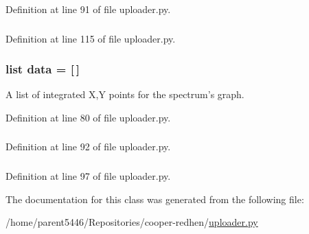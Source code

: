 Definition at line 91 of file uploader.py.\hypertarget{classuploader_1_1_spectrum_transfer_a511ae0b1c13f95e5f08f1a0dd3da3d93}{
\subsubsection[{data}]{}}
\label{classuploader_1_1_spectrum_transfer_a511ae0b1c13f95e5f08f1a0dd3da3d93}


Definition at line 115 of file uploader.py.\hypertarget{classuploader_1_1_spectrum_transfer_a018aaab493af92ea83348b0db6e32328}{
\subsubsection[{data}]{\setlength{\rightskip}{0pt plus 5cm}list {\bf data} = \mbox{[}$\,$\mbox{]}}}
\label{classuploader_1_1_spectrum_transfer_a018aaab493af92ea83348b0db6e32328}


A list of integrated X,Y points for the spectrum's graph. 

Definition at line 80 of file uploader.py.\hypertarget{classuploader_1_1_spectrum_transfer_a7aead736a07eaf25623ad7bfa1f0ee2d}{
\subsubsection[{type}]{}}
\label{classuploader_1_1_spectrum_transfer_a7aead736a07eaf25623ad7bfa1f0ee2d}


Definition at line 92 of file uploader.py.\hypertarget{classuploader_1_1_spectrum_transfer_a3f6f55ba521257932bb08684e0181fa1}{
\subsubsection[{xy}]{}}
\label{classuploader_1_1_spectrum_transfer_a3f6f55ba521257932bb08684e0181fa1}


Definition at line 97 of file uploader.py.

The documentation for this class was generated from the following file:\begin{DoxyCompactItemize}
\item 
/home/parent5446/Repositories/cooper-\/redhen/\hyperlink{uploader_8py}{uploader.py}\end{DoxyCompactItemize}
